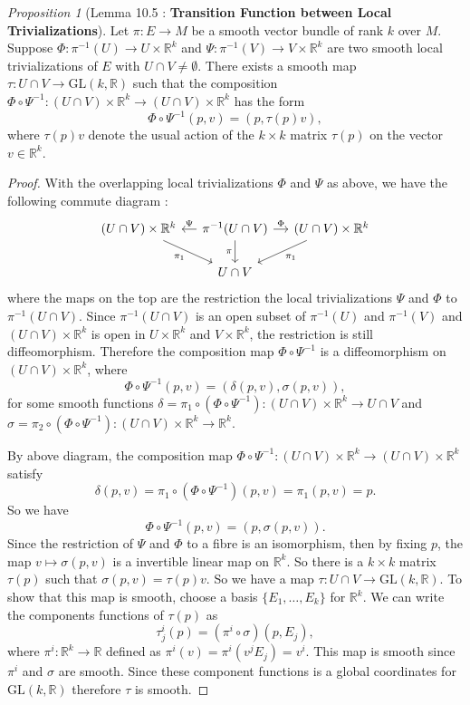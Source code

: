 \documentclass[a4paper]{article}
\theoremstyle{remark}
\newtheorem{prop}{Proposition}
\newcommand{\er}{\mathbb{R}} %
\newcommand{\rk}{\mathbb{R}^k} %
\newcommand{\GLsaja}{\text{GL}} %
\begin{document}
\begin{prop}[Lemma 10.5 : \textbf{Transition Function between Local Trivializations}]
Let $\pi : E \to M$ be a smooth vector bundle of rank $k$ over $M$. Suppose $\Phi : \pi^{-1}(U) \to U \times \rk$ and $\Psi : \pi^{-1}(V) \to V \times \rk$ are two smooth local trivializations of $E$ with $U \cap V \neq \emptyset$. There exists a smooth map $\tau : U \cap V \to \GLsaja(k,\er)$ such that the composition $\Phi \circ \Psi^{-1} : (U\cap V)\times \rk \to (U\cap V)\times \rk$ has the form 
$$
\Phi \circ \Psi^{-1} (p,v) = (p,\tau(p)v),
$$
where $\tau(p)v$ denote the usual action of the $k\times k$ matrix $\tau(p)$ on the vector $v \in \rk$.
\end{prop}
\begin{proof}
With the overlapping local trivializations $\Phi$ and $\Psi$ as above, we have the following commute diagram :
\[
\begin{tikzcd}[column sep=small]
(U\cap V)\times \rk \arrow[leftarrow]{r}{\Psi} \arrow[swap]{dr}{\pi_1} & \pi^{-1}(U \cap V) \arrow{r}{\Phi} \arrow[swap]{d}{\pi} & (U\cap V)\times \rk \arrow{dl}{\pi_1} \\
&U\cap V &
\end{tikzcd}
\]
where the maps on the top are the restriction the local trivializations $\Psi$ and $\Phi$ to $\pi^{-1}(U\cap V)$. Since $\pi^{-1}(U\cap V)$ is an open subset of $\pi^{-1}(U)$ and $\pi^{-1}(V)$ and $(U\cap V)\times \rk$ is open in $U\times \rk$ and $V\times \rk$, the restriction is still diffeomorphism. Therefore the composition map $\Phi \circ \Psi^{-1}$ is a diffeomorphism on $(U\cap V)\times \rk$, where
$$
\Phi \circ \Psi^{-1}(p,v) = (\delta(p,v), \sigma(p,v)),
$$ 
for some smooth functions $\delta = \pi_1 \circ (\Phi \circ \Psi^{-1}) : (U\cap V)\times \rk \to U\cap V $ and $\sigma = \pi_2 \circ (\Phi \circ \Psi^{-1}) : (U\cap V)\times \rk \to \rk$.

 By above diagram, the composition map $\Phi \circ \Psi^{-1} : (U\cap V)\times \rk \to (U\cap V)\times \rk$ satisfy
$$
\delta(p,v) = \pi_1 \circ (\Phi \circ \Psi^{-1})(p,v) = \pi_1(p,v)  = p.
$$
So we have 
$$
\Phi \circ \Psi^{-1}(p,v) = (p, \sigma(p,v)).
$$
Since the restriction of $\Psi$ and $\Phi$ to a fibre is an isomorphism, then by fixing $p$, the map $v \mapsto \sigma(p,v)$ is a invertible linear map on $\rk$. So there is a $k\times k$ matrix $\tau(p)$ such that $\sigma(p,v) = \tau(p)v$. So we have a map $\tau : U \cap V \to \GLsaja(k,\er)$. To show that this map is smooth, choose a basis $\{E_1,\dots,E_k\}$ for $\rk$. We can write the components functions of $\tau(p)$ as
$$
\tau^i_j(p) = (\pi^i \circ \sigma) (p,E_j),
$$
where $\pi^i : \rk \to \er$ defined as $\pi^i(v) = \pi^i (v^jE_j) = v^i$. This map is smooth since $\pi^i$ and $\sigma$ are smooth. Since these component functions is a global coordinates for $\GLsaja(k,\er)$ therefore $\tau$ is smooth.
\end{proof}
\end{document}
